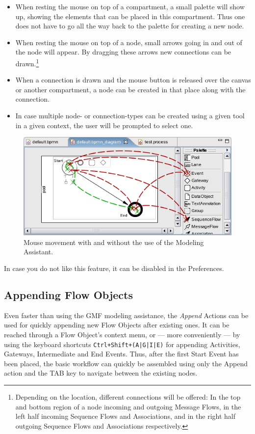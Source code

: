 \begin{itemize}
	\item When resting the mouse on top of a compartment, a small palette will
	show up, showing the elements that can be placed in this compartment.  Thus
	one does not have to go all the way back to the palette for creating a new
	node.
	
	\item When resting the mouse on top of a node, small arrows going in and out
	of the node will appear.  By dragging these arrows new connections can be
	drawn.\footnote{Depending on the location, different connections will be
	offered: In the top and bottom region of a node incoming and outgoing Message
	Flows, in the left half incoming Sequence Flows and Associations, and in the
	right half outgoing Sequence Flows and Associations respectively.}
	
	\item When a connection is drawn and the mouse button is released over the
	canvas or another compartment, a node can be created in that place along with
	the connection.
	
	\item In case multiple node- or connection-types can be created using a given
	tool in a given context, the user will be prompted to select one.
\end{itemize}

\begin{figure}[ht]
	\centering
	\includegraphics[width=.5\textwidth]{figures/features/modellingAssistant.png}
	\caption{Mouse movement with and without the use of the Modeling Assistant.}
	\label{fig:modAss}
\end{figure}

In case you do not like this feature, it can be disabled in the Preferences.



\subsection{Appending Flow Objects}
Even faster than using the GMF modeling assistance, the \emph{Append} Actions can
be used for quickly appending new Flow Objects after existing ones.  It can be
reached through a Flow Object's context menu, or --- more conveniently --- by
using the keyboard shortcuts \texttt{Ctrl+Shift+(A|G|I|E)} for appending Activities,
Gateways, Intermediate and End Events.  Thus, after the first Start Event has
been placed, the basic workflow can quickly be assembled using only the Append
action and the TAB key to navigate between the existing nodes.


